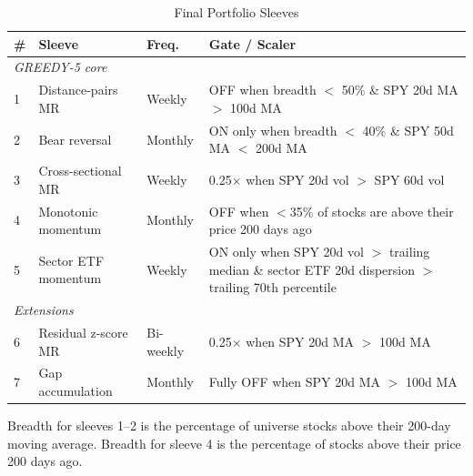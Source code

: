 \begin{table}[ht]
\centering
\caption{Final Portfolio Sleeves}
\label{tab:final_sleeves}
\begin{tabular}{lllp{8cm}}
\toprule
\textbf{\#} & \textbf{Sleeve} & \textbf{Freq.} & \textbf{Gate / Scaler} \\
\midrule
\multicolumn{4}{l}{\textit{GREEDY-5 core}} \\
1 & Distance-pairs MR   & Weekly    & {\small OFF when breadth $<$ 50\% \& SPY 20d MA $>$ 100d MA} \\
2 & Bear reversal       & Monthly   & {\small ON only when breadth $<$ 40\% \& SPY 50d MA $<$ 200d MA} \\
3 & Cross-sectional MR  & Weekly    & {\small 0.25$\times$ when SPY 20d vol $>$ SPY 60d vol} \\
4 & Monotonic momentum  & Monthly   & {\small OFF when $<$35\% of stocks are above their price 200 days ago} \\
5 & Sector ETF momentum & Weekly    & {\small ON only when SPY 20d vol $>$ trailing median \& sector ETF 20d dispersion $>$ trailing 70th percentile} \\
\midrule
\multicolumn{4}{l}{\textit{Extensions}} \\
6 & Residual z-score MR & Bi-weekly & {\small 0.25$\times$ when SPY 20d MA $>$ 100d MA} \\
7 & Gap accumulation    & Monthly   & {\small Fully OFF when SPY 20d MA $>$ 100d MA} \\
\bottomrule
\end{tabular}
\begin{tablenotes}
\small
\item Breadth for sleeves 1--2 is the percentage of universe stocks above their 200-day moving average.
Breadth for sleeve 4 is the percentage of stocks above their price 200 days ago.
\end{tablenotes}
\end{table}

